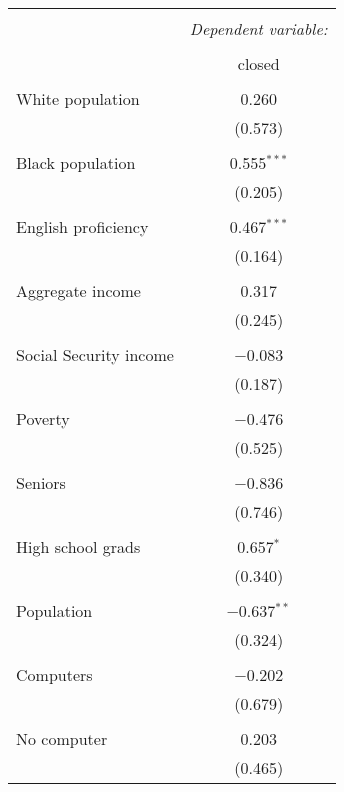 
\begin{table}[!htbp] \centering 
  \caption{} 
  \label{} 
\begin{tabular}{@{\extracolsep{5pt}}lc} 
\\[-1.8ex]\hline 
\hline \\[-1.8ex] 
 & \multicolumn{1}{c}{\textit{Dependent variable:}} \\ 
\cline{2-2} 
\\[-1.8ex] & closed \\ 
\hline \\[-1.8ex] 
 White population & 0.260 \\ 
  & (0.573) \\ 
  & \\ 
 Black population & 0.555$^{***}$ \\ 
  & (0.205) \\ 
  & \\ 
 English proficiency & 0.467$^{***}$ \\ 
  & (0.164) \\ 
  & \\ 
 Aggregate income & 0.317 \\ 
  & (0.245) \\ 
  & \\ 
 Social Security income & $-$0.083 \\ 
  & (0.187) \\ 
  & \\ 
 Poverty & $-$0.476 \\ 
  & (0.525) \\ 
  & \\ 
 Seniors & $-$0.836 \\ 
  & (0.746) \\ 
  & \\ 
 High school grads & 0.657$^{*}$ \\ 
  & (0.340) \\ 
  & \\ 
 Population & $-$0.637$^{**}$ \\ 
  & (0.324) \\ 
  & \\ 
 Computers & $-$0.202 \\ 
  & (0.679) \\ 
  & \\ 
 No computer & 0.203 \\ 
  & (0.465) \\ 

\end{tabular}
\end{table}
